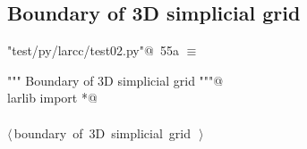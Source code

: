 \documentclass[11pt,oneside]{article}    %
\begin{document}
\subsection{Boundary of 3D simplicial grid}

\begin{flushleft} \small
\begin{minipage}{\linewidth} \label{scrap97}
\protect{}\verb@"test/py/larcc/test02.py"@\nobreak\ {\footnotesize 55a }$\equiv$
\vspace{-1ex}
\begin{list}{}{} \item
\mbox{}\verb@""" Boundary of 3D simplicial grid """@\\
\mbox{}\verb@from larlib import *@\\
\mbox{}\verb@@\\
\mbox{}\verb@@\hbox{$\langle\,$boundary of 3D simplicial grid\nobreak\ {\footnotesize {}}$\,\rangle$}\verb@@\\
\mbox{}\verb@@{\NWsep}
\end{list}
\vspace{-2ex}
\end{minipage}\\[4ex]
\end{flushleft}
\end{document}
